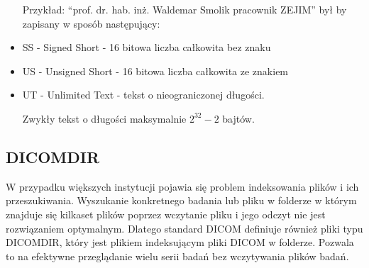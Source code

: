 \begin{itemize}
    Przykład: \enquote{prof. dr. hab. inż. Waldemar Smolik pracownik ZEJIM} był by zapisany w sposób następujący: 

    \item SS - Signed Short - 16 bitowa liczba całkowita bez znaku
    
    \item US - Unsigned Short - 16 bitowa liczba całkowita ze znakiem

    \item UT - Unlimited Text - tekst o nieograniczonej długości.

    Zwykły tekst o długości maksymalnie $2^{32}-2$ bajtów.
\end{itemize}

\subsection{DICOMDIR}

W przypadku większych instytucji pojawia się problem indeksowania plików i ich przeszukiwania.
Wyszukanie konkretnego badania lub pliku w folderze w którym znajduje się kilkaset plików poprzez wczytanie pliku i jego odczyt nie jest rozwiązaniem optymalnym.
Dlatego standard DICOM definiuje również pliki typu DICOMDIR, który jest plikiem indeksującym pliki DICOM w folderze.
Pozwala to na efektywne przeglądanie wielu serii badań bez wczytywania plików badań.